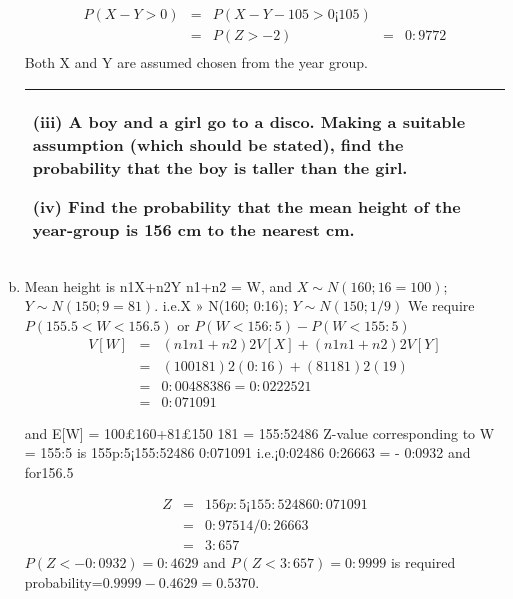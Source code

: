 \documentclass[a4paper,12pt]{article}
\begin{document}
\begin{enumerate}[(a)]
\begin{eqnarray*}
P(X - Y > 0) &=& P(X - Y - 10
5 > 0¡10
5 ) \\ &=& P(Z > - 2) &=& 0:9772 \\
\end{eqnarray*}
Both X and Y are assumed
chosen from the year group.
\newpage

   \begin{table}[ht!]
  \centering
  \begin{tabular}{|p{15cm}|}
  \hline
(iii) A boy and a girl go to a disco.  Making a suitable assumption (which should be stated), find the probability that the boy is taller than the girl.
 
(iv) Find the probability that the mean height of the year-group is 156 cm to the nearest cm. \\    \hline
   \end{tabular}
 \end{table}
\item  Mean height is n1X+n2Y
n1+n2
= W, and $X \sim N(160; 16=100)$; $Y \sim N(150; 9=81)$. i.e.X »
N(160; 0:16); 
$Y \sim N(150; 1/9)$ We require $P(155.5 < W < 156.5)$ or $P(W < 156:5) - P(W < 155:5)$
\begin{eqnarray*}
V [W] &=& ( n1
n1+n2
)2V [X] + ( n1
n1+n2
)2V [Y ] \\ &=& ( 100
181 )2(0:16) + ( 81
181 )2( 1
9 ) \\ &=& 0:00488386 =
0:0222521 \\
&=&  0:071091
\end{eqnarray*}

and E[W] = 100£160+81£150
181 = 155:52486
Z-value corresponding to W = 155:5 is 155p:5¡155:52486
0:071091
i.e.¡0:02486
0:26663 = - 0:0932 and for156.5

\begin{eqnarray*}
Z &=& 156p:5¡155:52486
0:071091 \\ 
&=& 0:97514 /  0:26663 \\ 
&=& 3:657
\end{eqnarray*}
$P(Z < - 0:0932) = 0:4629$ and $P(Z < 3:657) = 0:9999$ is required probability=$0.9999-
0.4629=0.5370$.

\end{enumerate}
\end{document}
